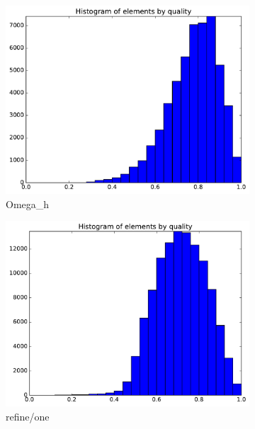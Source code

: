 \documentclass[3p,times,procedia,number]{elsarticle}
\begin{document}
\begin{figure}
\begin{subfigure}{.24\textwidth}
\includegraphics[width=\textwidth]{omega_h-cube-linear-quality.pdf}
\caption{Omega\_h}
\end{subfigure}
\begin{subfigure}{.24\textwidth}
\centering
\includegraphics[width=\textwidth]{refine-one-cube-linear-quality.pdf}
\caption{refine/one}
\end{subfigure}
\begin{subfigure}{.24\textwidth}
\centering

\end{subfigure}
\end{figure}
\end{document}
